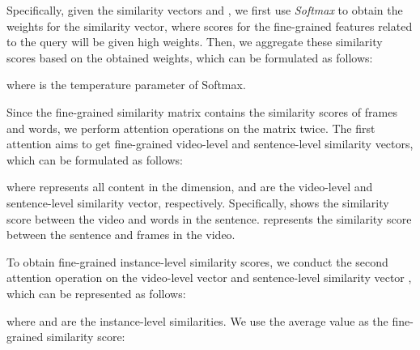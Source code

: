 \documentclass[sigconf]{acmart}
\begin{document}
Specifically, given the similarity vectors  and , we first use \emph{Softmax} to obtain the weights for the similarity vector, where scores for the fine-grained features related to the query will be given high weights. Then, we aggregate these similarity scores based on the obtained weights, which can be formulated as follows:


where  is the temperature parameter of Softmax.

Since the fine-grained similarity matrix  contains the similarity scores of  frames and  words, we perform attention operations on the matrix twice. The first attention aims to get fine-grained video-level and sentence-level similarity vectors, which can be formulated as follows:


where  represents all content in the dimension,  and  are the video-level and sentence-level similarity vector, respectively. Specifically,  shows the similarity score between the video and  words in the sentence.   represents the similarity score between the sentence and  frames in the video.

To obtain fine-grained instance-level similarity scores, we conduct the second attention operation on the video-level vector  and sentence-level similarity vector , which can be represented as follows: 


where  and  are the instance-level similarities. We use the average value as the fine-grained similarity score:
\end{document}
